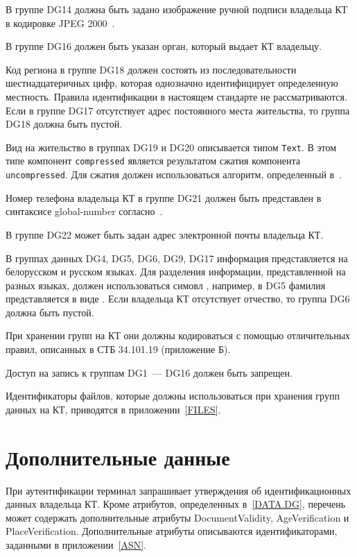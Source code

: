 
В группе DG14 должна быть задано изображение ручной подписи
владельца КТ в кодировке JPEG 2000~\cite{JPEG2000}.

В группе DG16 должен быть указан орган, который выдает КТ владельцу.


Код региона в группе DG18 должен состоять из последовательности 
шестнадцатеричных цифр, которая однозначно идентифицирует определенную 
местность. Правила идентификации в настоящем стандарте не рассматриваются. 
Если в группе DG17 отсутствует адрес постоянного места жительства, то 
группа DG18 должна быть пустой. 
\fi

Вид на жительство в группах DG19 и DG20 описывается типом \verb|Text|. 
В этом типе компонент \verb|compressed| является результатом сжатия компонента 
\verb|uncompressed|. Для сжатия должен использоваться алгоритм, 
определенный в~\cite{DEFLATE}. 
\fi

Номер телефона владельца КТ в группе DG21 должен быть
представлен в синтаксисе global-number согласно~\cite{RFC3966}. 

В группе DG22 может быть задан адрес электронной 
почты владельца КТ. 

В группах данных DG4, DG5, DG6, DG9, DG17 информация
представляется на белорусском и русском языках.
Для разделения информации, представленной на разных языках,
должен использоваться симовл \str{/}, например, в DG5 фамилия 
представляется в виде .
Если владельца КТ отсутствует отчество, то группа DG6 должна быть пустой. 

При хранении групп на КТ они должны кодироваться с помощью отличительных 
правил, описанных в СТБ 34.101.19 (приложение Б). 

Доступ на запись к группам DG1~--- DG16 должен быть запрещен.
 
Идентификаторы файлов, которые
должны использоваться при хранения групп данных на КТ,
приводятся в приложении~\ref{FILES}.

\section{Дополнительные данные}\label{DATA.Optional}

При аутентификации терминал запрашивает утверждения об идентификационных
данных владельца КТ. Кроме атрибутов, определенных в~\ref{DATA.DG}, 
перечень может содержать дополнительные атрибуты DocumentValidity, 
AgeVerification и PlaceVerification. Дополнительные атрибуты описываются 
идентификаторами, заданными в приложении~\ref{ASN}. 

